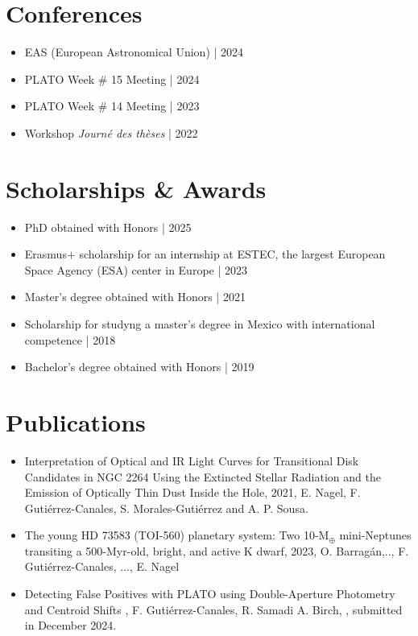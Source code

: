 \documentclass[11pt,a4paper]{article}
\begin{document}
	\section{Conferences}

		\begin{itemize}
			\item EAS (European Astronomical Union) | 2024
			\item PLATO Week \# 15 Meeting | 2024
			\item PLATO Week \# 14 Meeting | 2023
			\item Workshop \textit{Journé des thèses} | 2022
		\end{itemize}

	
	\section{Scholarships \& Awards}
	\begin{itemize}
		\item PhD obtained with Honors | 2025
		\item Erasmus$+$ scholarship for an internship at ESTEC, the largest European Space Agency (ESA) center in Europe | 2023
		\item Master's degree obtained with Honors | 2021
		\item Scholarship for studyng a master's degree in Mexico with international competence | 2018
		\item Bachelor's degree obtained with Honors | 2019
	\end{itemize}
	
	\section{Publications}
	\begin{itemize}
		\item Interpretation of Optical and IR Light Curves for Transitional Disk Candidates in NGC 2264 Using the Extincted Stellar Radiation and the Emission of Optically Thin Dust Inside the Hole, 2021, E. Nagel, F. Gutiérrez-Canales, S. Morales-Gutiérrez and A. P. Sousa.
		\item The young HD 73583 (TOI-560) planetary system: Two 10-M$_{\oplus}$ mini-Neptunes transiting a 500-Myr-old, bright, and active K dwarf, 2023, O. Barrag\'an,.., F. Gutiérrez-Canales, ..., E. Nagel
		\item Detecting False Positives with PLATO using Double-Aperture Photometry and Centroid Shifts , F. Gutiérrez-Canales, R. Samadi A. Birch, , submitted in December 2024.
	\end{itemize}
	
\end{document}

